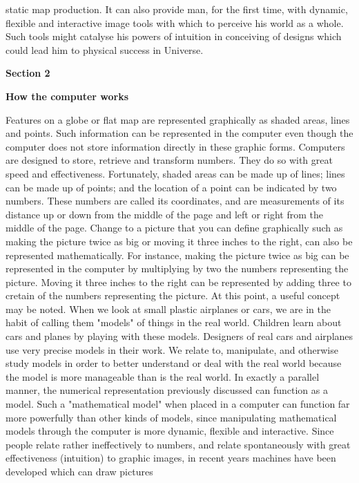 static map production.  It can also provide man, for
the first time, with dynamic, flexible and interactive
image tools with which to perceive his world
as a whole.  Such tools might catalyse his powers of
intuition in conceiving of designs which could lead
him to physical success in Universe.
\vfill\eject
\centerline{\bf Section 2}
\medskip\centerline{\bf How the computer works}
\bigskip\bigskip\flushpar
Features on a globe or flat map are represented
graphically as shaded areas, lines and points.  Such
information can be represented in the computer even
though the computer does not store information directly
in these graphic forms.
\bigskip\flushpar
Computers are designed to store, retrieve and
transform numbers.  They do so with great speed and
effectiveness.  Fortunately, shaded areas can be made
up of lines; lines can be made up of points; and the
location of a point can be indicated by two numbers.
These numbers are called its coordinates, and are
measurements of its distance up or down from the middle
of the page and left or right from the middle of the
page.
\bigskip\flushpar
Change to a picture that you can define graphically
such as making the picture twice as big or moving it
three inches to the right, can also be represented
mathematically.  For instance, making the picture twice
as big can be represented in the computer by multiplying
by two the numbers representing the picture.  Moving
it three inches to the right can be represented by
adding three to cretain of the numbers representing
the picture.
\bigskip\flushpar
At this point, a useful concept may be noted.  When
we look at small plastic airplanes or cars,  we are in
the habit of calling them "models" of things in the
real world.  Children learn about cars and planes by
playing with these models.  Designers of real cars and
airplanes use very precise models in their work.  We
relate to, manipulate, and otherwise study models in
order to better understand or deal with the real world
because the model is more manageable than is the real
world.
\bigskip\flushpar
In exactly a parallel manner, the numerical
representation previously discussed can function as
a model.  Such a "mathematical model" when placed in a
computer can function far more powerfully than other
kinds of models, since manipulating mathematical models
through the computer is more dynamic, flexible and
interactive.
\bigskip\flushpar
Since people relate rather ineffectively to
numbers, and relate spontaneously with great effectiveness
(intuition) to graphic images, in recent years
machines have been developed which can draw pictures
